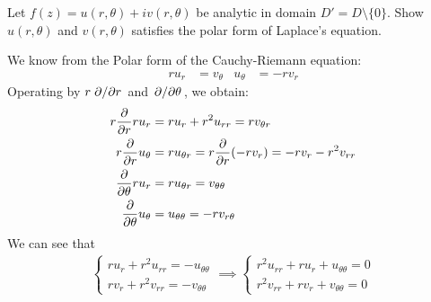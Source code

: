 \documentclass[12pt, english]{book}
\makeatletter
\renewenvironment{proof}[1][\proofname]{\par
	\pushQED{\qed}%
	\normalfont \topsep6\p@\@plus6\p@\relax
	\list{}{%
		\settowidth{\leftmargin}{\itshape\proofname:\hskip\labelsep}%
		\setlength{\labelwidth}{0pt}%
		\setlength{\itemindent}{-\leftmargin}%
	}%
	\item[\hskip\labelsep\itshape#1\@addpunct{:}]\ignorespaces
}{%
	\popQED\endlist\@endpefalse
}
\makeatother
\begin{document}
	\begin{example}
		\label{Laplace's Equation (Polar) Exercise - Complex}
		Let \(f(z) = u(r, \theta) + iv(r, \theta)\) be analytic in domain \(D' = D \setminus \{0\}\). Show \(u(r, \theta)\) and \(v(r, \theta)\) satisfies the polar form of Laplace's equation.
		\begin{proof}{\color{Grey}
			We know from the Polar form of the Cauchy-Riemann equation:
			\begin{align*}
				ru_r &= v_\theta & u_\theta &= -rv_r
			\end{align*}
			Operating by \(r \pdv*{r}\) and \(\pdv*{\theta}\), we obtain:
			\begin{align*}
				r \pdv{r} r u_r &= ru_r + r^2 u_{rr} = r v_{\theta r} \\
				r \pdv{r} u_\theta &= ru_{\theta r} = r \pdv{r} (-rv_r) = -rv_r - r^2v_{rr} \\
				\pdv{\theta} ru_{r} &= r u_{\theta r} = v_{\theta \theta} \\
				\pdv{\theta} u_\theta &= u_{\theta \theta} = -r v_{r \theta}
			\end{align*}
			We can see that 
			\begin{align*}
				\begin{cases}
					ru_r + r^2 u_{rr} = -u_{\theta \theta} \\
					rv_r + r^2 v_{rr} = -v_{\theta \theta}
				\end{cases}
				\implies
				\begin{cases}
					r^2 u_{rr} + ru_r + u_{\theta \theta} = 0 \\
					r^2 v_{rr} + rv_r + v_{\theta \theta} = 0
				\end{cases}
			\end{align*}
			}
		\end{proof}
	\end{example}
\end{document}
